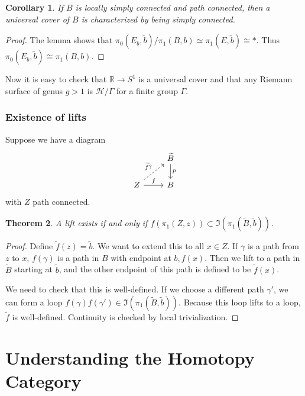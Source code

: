 \documentclass[leqno, openany]{memoir}
\newtheorem{thm}{Theorem}[section]
\newtheorem{cor}[thm]{Corollary}
\theoremstyle{definition}
\theoremstyle{remark}
\theoremstyle{plain}
\theoremstyle{definition}
\theoremstyle{remark}
\newcommand{\R}{\mathbb{R}}
\newcommand{\mc}[1]{\mathcal{#1}}
\newcommand{\wt}[1]{\widetilde{#1}}
\begin{document}
\begin{cor} If $B$ is locally simply connected and path connected, then a
universal cover of $B$ is characterized by being simply connected.  \end{cor}

\begin{proof} The lemma shows that $\pi_0(E_b, \wt{b}) / \pi_1(B,b) \simeq
\pi_1(E,\wt{b}) \cong *$. Thus $\pi_0(E_b,\wt{b}) \cong \pi_1(B,b)$.
\end{proof}

Now it is easy to check that $\R \to S^1$ is a universal cover and that any
Riemann surface of genus $g > 1$ is $\mc{H} / \Gamma$ for a finite group
$\Gamma$.

\subsection{Existence of lifts}%

Suppose we have a diagram \begin{equation} \begin{tikzcd} & \wt{B} \arrow{d}{p}
\\ Z \arrow{r}{f} \arrow[dashrightarrow]{ur}{\wt{f}?} & B \end{tikzcd}
\end{equation} with $Z$ path connected.

\begin{thm} A lift exists if and only if $f(\pi_1(Z,z)) \subset
\Im(\pi_1(\wt{B}, \wt{b}))$.  \end{thm}

\begin{proof} Define $\wt{f}(z) = \wt{b}$. We want to extend this to all $x \in
    Z$. If $\gamma$ is a path from $z$ to $x$, $f(\gamma)$ is a path in $B$
    with endpoint at $b,f(x)$. Then we lift to a path in $\wt{B}$ starting at
    $\wt{b}$, and the other endpoint of this path is defined to be $\wt{f}(x)$.

    We need to check that this is well-defined. If we choose a different path
$\gamma'$, we can form a loop $f(\gamma) f(\gamma') \in
\Im(\pi_1(\wt{B},\wt{b}))$. Because this loop lifts to a loop, $\wt{f}$ is
well-defined. Continuity is checked by local trivialization.  \end{proof}

\chapter{Understanding the Homotopy Category}%
\end{document}
